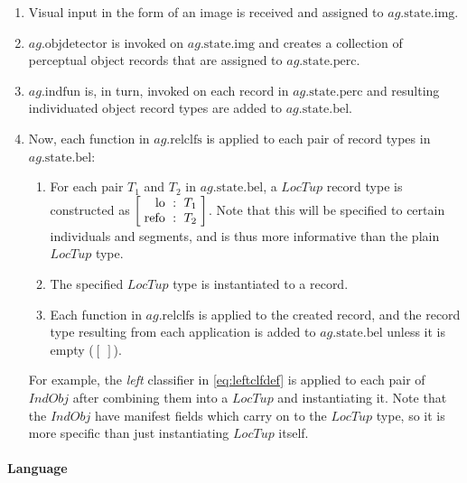 \begin{enumerate}
\item Visual input in the form of an image is received and assigned to $ag.\text{state}.\text{img}$.
\item $ag.\text{objdetector}$ is invoked on $ag.\text{state.img}$ and creates a collection of perceptual object records that are assigned to $ag.\text{state}.\text{perc}$.
\item $ag.\text{indfun}$ is, in turn, invoked on each record in $ag.\text{state.perc}$ and resulting individuated object record types are added to $ag.\text{state.bel}$.
\item Now, each function in $ag.\text{relclfs}$ is applied to each pair of record types in $ag.\text{state.bel}$:
	\begin{enumerate}
    \item For each pair $T_1$ and $T_2$ in $ag.\text{state.bel}$, a $LocTup$ record type is constructed as $\rec{\text{lo} &:& T_1 \\ \text{refo} &:& T_2}$.
    Note that this will be specified to certain individuals and segments, and is thus more informative than the plain $LocTup$ type.
    \item The specified $LocTup$ type is instantiated to a record.
	\item Each function in $ag.\text{relclfs}$ is applied to the created record, and the record type resulting from each application is added to $ag.\text{state.bel}$ unless it is empty ($[\:]$).
	\end{enumerate}
	For example, the \textit{left} classifier in \autoref{eq:leftclfdef} is applied to each pair of $IndObj$ after combining them into a $LocTup$ and instantiating it.
    Note that the $IndObj$ have manifest fields which carry on to the $LocTup$ type, so it is more specific than just instantiating $LocTup$ itself.
\end{enumerate}

\paragraph{Language}

